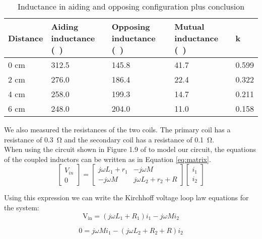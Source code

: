 \documentclass[final]{scrreprt} %
\begin{document}
\begin{table} [h]
\begin{center}
	\begin{tabular}{ l | l | l | l | l }
	Distance & Aiding inductance (\si{\micro\henri}) & Opposing inductance (\si{\micro\henri}) & Mutual inductance (\si{\micro\henri}) & k \\ \hline
  	0 cm & 312.5 & 145.8 & 41.7 & 0.599 \\
	2 cm & 276.0 & 186.4 & 22.4 & 0.322 \\
	4 cm & 258.0 & 199.3 & 14.7 & 0.211 \\
	6 cm & 248.0 & 204.0 & 11.0 & 0.158 \\
	\end{tabular}
	\caption{Inductance in aiding and opposing configuration plus conclusion}
	\label{tab:inductances}
\end{center}
\end{table}

We also measured the resistances of the two coils. 
The primary coil has a resistance of \SI{0.3}{\ohm} and the secondary coil has a resistance of \SI{0.1}{\ohm}.\\

When using the circuit shown in Figure 1.9 of \cite{epo4-manual} to model our circuit, the equations of the coupled inductors can be written as in Equation \ref{eq:matrix}.\\
\begin{equation}
	\begin{bmatrix}
		V_{in} \\
		0
	\end{bmatrix} =
	\begin{bmatrix}
		j \omega L_1 + r_1 & -j \omega M \\
		-j \omega M & j \omega L_2 + r_2 + R
	\end{bmatrix}
	\begin{bmatrix}
		i_1 \\
		i_2
	\end{bmatrix}
	\label{eq:matrix}
\end{equation}


Using this expression we can write the Kirchhoff voltage loop law equations for the system:
\begin{equation} 
\label{eq3}
\boldsymbol{\mathrm{V_{in}}} = (j\omega {L_{1}} + {R_{1}} ) i_{1} - j\omega M i_{2}
\end{equation}

\begin{equation}
\label{eq4}
0 = j\omega M i_{1} -(j\omega {L_{2}} + {R_{2}} + R) i_{2}
\end{equation}
\end{document}
